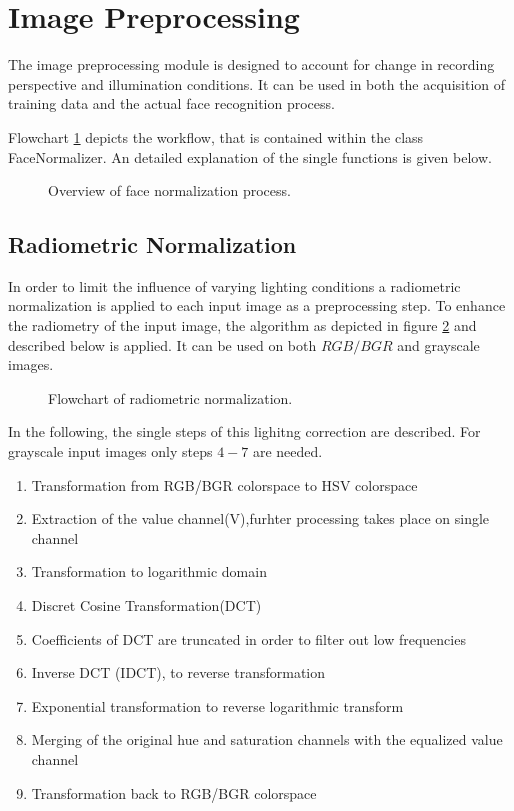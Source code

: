 \section{Image Preprocessing}
The image preprocessing module is designed to account for change in recording perspective and illumination conditions.
It can be used in both the acquisition of training data and the actual face recognition process.

Flowchart \ref{fc:FaceNorm} depicts the workflow, that is contained within the class FaceNormalizer.
An detailed explanation of the single functions is given below.


\begin{figure}
\centering
{}
\caption{Overview of face normalization process.}
\label{fc:FaceNorm}
\end{figure}

\subsection{Radiometric Normalization}

In order to limit the influence of varying lighting conditions a radiometric normalization is 
applied to each input image as a preprocessing step.
To enhance the radiometry of the input image, the algorithm as depicted in figure \ref{fc:RadNorm}
and described below is applied.
It can be used on both $RGB/BGR$ and grayscale images.

\begin{figure}
\centering
{}
\caption{Flowchart of radiometric normalization.}
\label{fc:RadNorm}
\end{figure}

In the following, the single steps of this lighitng correction are described. For grayscale input images
only steps $4-7$ are needed.
\begin{enumerate}
\item Transformation from RGB/BGR colorspace to HSV colorspace
\item Extraction of the value channel(V),furhter processing takes place on single channel
\item Transformation to logarithmic domain
\item Discret Cosine Transformation(DCT)
\item Coefficients of DCT are truncated in order to filter out low frequencies
\item Inverse DCT (IDCT), to reverse transformation
\item Exponential transformation to reverse logarithmic transform
\item Merging of the original hue and saturation channels with the equalized value channel
\item Transformation back to RGB/BGR colorspace
\end{enumerate}

